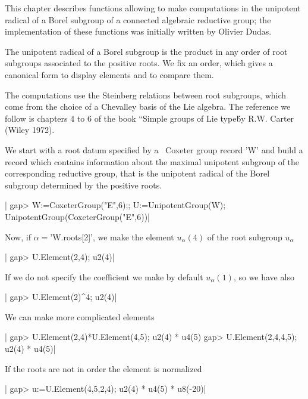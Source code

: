 
This  chapter  describes  functions  allowing  to  make computations in the
unipotent  radical of a  Borel subgroup of  a connected algebraic reductive
group;  the  implementation  of  these  functions  was initially written by
Olivier Dudas.

The  unipotent radical of a  Borel subgroup is the  product in any order of
root  subgroups associated  to the  positive roots.  We fix an order, which
gives a canonical form to display elements and to compare them.

The  computations use the Steinberg relations between root subgroups, which
come from the choice of a Chevalley basis of the Lie algebra. The reference
we  follow is chapters 4 to 6  of the book \cite{Car72b} ``Simple groups of
Lie type\'\' by R.W. Carter (Wiley 1972).

We start with a root datum specified by a \CHEVIE\ Coxeter group record 'W'
and  build a record which contains  information about the maximal unipotent
subgroup  of  the  corresponding  reductive  group,  that  is the unipotent
radical of the Borel subgroup determined by the positive roots.

|    gap> W:=CoxeterGroup("E",6);; U:=UnipotentGroup(W);
    UnipotentGroup(CoxeterGroup("E",6))|

Now, if $\alpha=$'W.roots[2]', we make the element $u_\alpha(4)$
of the root subgroup $u_\alpha$\:

|    gap> U.Element(2,4);
    u2(4)|

If we do not specify the coefficient we make by default $u_\alpha(1)$, so we
have also\:

|    gap> U.Element(2)^4;
    u2(4)|

We can make more complicated elements\:

|    gap> U.Element(2,4)*U.Element(4,5);
    u2(4) * u4(5)
    gap> U.Element(2,4,4,5);
    u2(4) * u4(5)|

If the roots are not in order the element is normalized\:

|    gap> u:=U.Element(4,5,2,4);
    u2(4) * u4(5) * u8(-20)|

